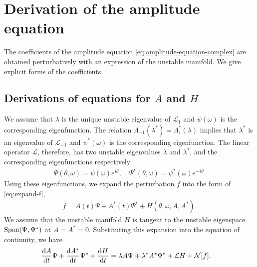 \section{Derivation of the amplitude equation}
\label{sec:amp-eq}

  The coefficients of the amplitude equation \eqref{eq:amplitude-equation-complex}
  are obtained perturbatively with an expression of the unstable manifold.
  We give explicit forms of the coefficients.

\subsection{Derivations of equations for $A$ and $H$}

We assume that $\lambda$ is the unique unstable eigenvalue of $\mathcal{L}_{1}$
and $\psi(\omega)$ is the corresponding eigenfunction.
The relation $\Lambda_{-1}(\lambda^{\ast})=\Lambda_{1}^{\ast}(\lambda)$
implies that $\lambda^{\ast}$ is an eigenvalue of $\mathcal{L}_{-1}$
and $\psi^{\ast}(\omega)$ is the corresponding eigenfunction.
The linear operator $\mathcal{L}$, therefore, has two unstable eigenvalues
$\lambda$ and $\lambda^{\ast}$, and the corresponding eigenfunctions respectively
\begin{align}
  \Psi(\theta,\omega) = \psi(\omega) e^{i\theta},
  \quad
  \Psi^{\ast}(\theta,\omega) = \psi^{\ast}(\omega) e^{-i\theta}.
\end{align}
Using these eigenfunctions, we expand the perturbation $f$
into the form of \eqref{eq:expand-f},
\begin{align}
  f = A(t)\Psi + A^{\ast}(t)\Psi^{\ast} + H(\theta,\omega,A,A^{\ast}).
\end{align}
We assume that the unstable manifold $H$ is tangent
to the unstable eigenspace ${\rm Span}(\Psi,\Psi^{\ast})$
at $A=A^{\ast}=0$.
Substituting this expansion into the equation of continuity, we have
\begin{align}
    \frac{{\rm d}A}{{\rm d}t} \Psi
    + \frac{{\rm d}A^{\ast}}{{\rm d}t} \Psi^{\ast}
    + \frac{{\rm d}H}{{\rm d}t} 
    & = \lambda A \Psi + \lambda^{\ast}A^{\ast}\Psi^{\ast}
    + \mathcal{L}H + \mathcal{N}[f].
  \label{eq:expanded-eq-continuity}
\end{align}

